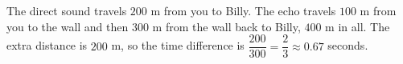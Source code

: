 The direct sound travels $200$ m from you to Billy. The echo travels $100$ m from you to the wall and then $300$ m from the wall back to Billy, $400$ m in all. The extra distance is $200$ m, so the time difference is $\dfrac{200}{300}=\dfrac{2}{3}\approx\boxed{0.67}$ seconds.
